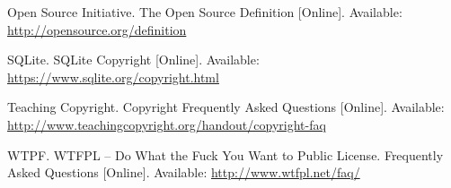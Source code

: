 \documentclass[12pt,letterpaper]{article}
\begin{document}
\begin{thebibliography}{20}
 Open Source Initiative. The Open Source Definition [Online]. Available: \url{http://opensource.org/definition}

 SQLite. SQLite Copyright [Online]. Available: \url{https://www.sqlite.org/copyright.html}

 Teaching Copyright. Copyright Frequently Asked Questions [Online]. Available: \url{http://www.teachingcopyright.org/handout/copyright-faq}

 WTPF. WTFPL – Do What the Fuck You Want to Public License. Frequently Asked Questions [Online]. Available: \url{http://www.wtfpl.net/faq/}

\end{thebibliography}
\end{document}
